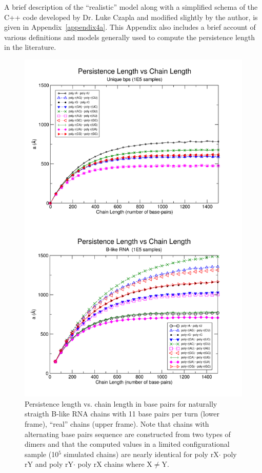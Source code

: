 A brief description of the ``realistic'' model along with a simplified
schema  of the  C++ code  developed by  Dr. Luke  Czapla  and modified
slightly by  the author,  is given in  Appendix~\ref{appendix4a}. This
Appendix  also includes  a brief  account of  various  definitions and
models  generally  used  to  compute  the persistence  length  in  the
literature.


\begin{figure}
\centering
\includegraphics[angle=0, scale=2.6]{Chapter4/perVlen.png}
\caption{Persistence  length  vs.  chain   length  in  base  pairs  for
  naturally straigth  B-like RNA  chains with 11  base pairs  per turn
  (lower frame), ``real'' chains  (upper frame). Note that chains with
  alternating base  pairs sequence are  constructed from two  types of
  dimers  and that the  computed values  in a  limited configurational
  sample (10$^{\text{5}}$  simulated chains) are  nearly identical for
  poly  rX$\cdot$ poly  rY and  poly  rY$\cdot$ poly  rX chains  where
  X$\neq$Y.}
\label{fig:perVlen}
\end{figure}

